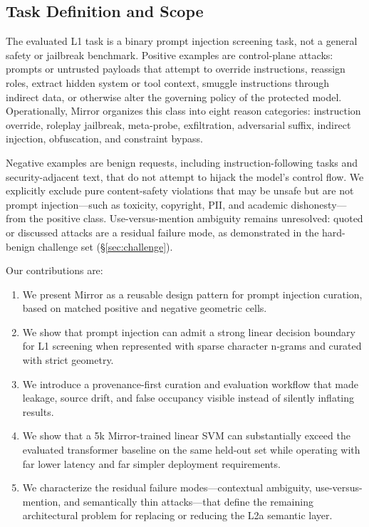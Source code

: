 \documentclass[11pt,a4paper]{article}
\begin{document}
\subsection{Task Definition and Scope}
\label{sec:task}

The evaluated L1 task is a binary prompt injection screening task, not a
general safety or jailbreak benchmark. Positive examples are
control-plane attacks: prompts or untrusted payloads that attempt to
override instructions, reassign roles, extract hidden system or tool
context, smuggle instructions through indirect data, or otherwise alter
the governing policy of the protected model. Operationally, Mirror
organizes this class into eight reason categories: instruction override,
roleplay jailbreak, meta-probe, exfiltration, adversarial suffix,
indirect injection, obfuscation, and constraint bypass.

Negative examples are benign requests, including instruction-following
tasks and security-adjacent text, that do not attempt to hijack the
model's control flow. We explicitly exclude pure content-safety
violations that may be unsafe but are not prompt injection---such as
toxicity, copyright, PII, and academic dishonesty---from the positive
class. Use-versus-mention ambiguity remains unresolved: quoted or
discussed attacks are a residual failure mode, as demonstrated in the
hard-benign challenge set (\S\ref{sec:challenge}).

Our contributions are:

\begin{enumerate}[nosep]
  \item We present Mirror as a reusable design pattern for prompt
    injection curation, based on matched positive and negative geometric
    cells.
  \item We show that prompt injection can admit a strong linear decision
    boundary for L1 screening when represented with sparse character
    n-grams and curated with strict geometry.
  \item We introduce a provenance-first curation and evaluation workflow
    that made leakage, source drift, and false occupancy visible instead
    of silently inflating results.
  \item We show that a 5k Mirror-trained linear SVM can substantially
    exceed the evaluated transformer baseline on the same held-out set
    while operating with far lower latency and far simpler deployment
    requirements.
  \item We characterize the residual failure modes---contextual
    ambiguity, use-versus-mention, and semantically thin attacks---that
    define the remaining architectural problem for replacing or reducing
    the L2a semantic layer.
\end{enumerate}
\end{document}
